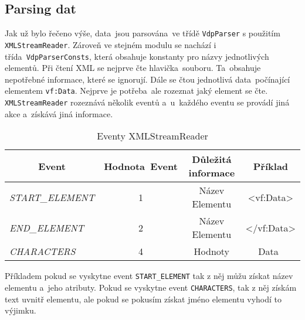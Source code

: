 \subsection{Parsing dat}
Jak už bylo řečeno výše, data~jsou parsována~ve třídě \texttt{VdpParser} s použitím \\ \texttt{XMLStreamReader}.
Zároveň ve stejném modulu se nachází i třída~\texttt{VdpParserConsts}, která obsahuje konstanty pro názvy jednotlivých elementů.
Při čtení XML se nejprve čte hlavička~souboru. Ta~obsahuje nepotřebné informace, které se ignorují.
Dále se čtou jednotlivá data~počínající elementem \texttt{vf:Data}.
Nejprve je potřeba~ale rozeznat jaký element se čte.
\texttt{XMLStreamReader} rozeznává několik eventů a~u~každého eventu se provádí jiná akce a~získává jiná informace.
\begin{table}[!h]
    \label{tab:xmlStreamReader}
    \centering
    \caption{Eventy XMLStreamReader}
    \begin{tabular}{|l|c|c|c|}
    \hline
    \multicolumn{1}{|c|}{\textbf{Event}} & \textbf{Hodnota~Event} & \textbf{Důležitá informace} & \textbf{Příklad}                                 \\ \hline
    \textit{START\_ELEMENT}              & 1                      & Název Elementu              & \textless{}vf:Data\textgreater{}                 \\ \hline
    \textit{END\_ELEMENT}                & 2                      & Název Elementu              & \textless{}/vf:Data\textgreater{} \\ \hline
    \textit{CHARACTERS}                  & 4                      & Hodnoty                     & Data~                                            \\ \hline
    \end{tabular}
\end{table}

Příkladem pokud se vyskytne event \texttt{START\_ELEMENT} tak z něj můžu získat název elementu a~jeho atributy.
Pokud se vyskytne event \texttt{CHARACTERS}, tak z něj získám text uvnitř elementu, ale pokud se pokusím získat jméno elementu vyhodí to výjimku.

